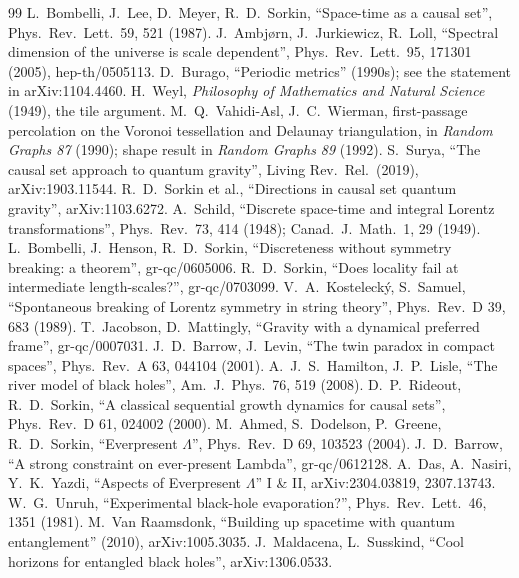 \documentclass[11pt,a4paper]{article}
\begin{document}
\begin{thebibliography}{99}\small
{} L.~Bombelli, J.~Lee, D.~Meyer, R.~D.~Sorkin, ``Space-time as a causal set'', Phys.\ Rev.\ Lett.\ 59, 521 (1987).
 J.~Ambj{\o}rn, J.~Jurkiewicz, R.~Loll, ``Spectral dimension of the universe is scale dependent'', Phys.\ Rev.\ Lett.\ 95, 171301 (2005), hep-th/0505113.
 D.~Burago, ``Periodic metrics'' (1990s); see the statement in arXiv:1104.4460.
 H.~Weyl, \emph{Philosophy of Mathematics and Natural Science} (1949), the tile argument.
 M.~Q.~Vahidi-Asl, J.~C.~Wierman, first-passage percolation on the Voronoi tessellation and Delaunay triangulation, in \emph{Random Graphs 87} (1990); shape result in \emph{Random Graphs 89} (1992).
 S.~Surya, ``The causal set approach to quantum gravity'', Living Rev.\ Rel.\ (2019), arXiv:1903.11544.
 R.~D.~Sorkin et al., ``Directions in causal set quantum gravity'', arXiv:1103.6272.
 A.~Schild, ``Discrete space-time and integral Lorentz transformations'', Phys.\ Rev.\ 73, 414 (1948); Canad.\ J.\ Math.\ 1, 29 (1949).
 L.~Bombelli, J.~Henson, R.~D.~Sorkin, ``Discreteness without symmetry breaking: a theorem'', gr-qc/0605006.
 R.~D.~Sorkin, ``Does locality fail at intermediate length-scales?'', gr-qc/0703099.
 V.~A.~Kosteleck\'y, S.~Samuel, ``Spontaneous breaking of Lorentz symmetry in string theory'', Phys.\ Rev.\ D 39, 683 (1989).
 T.~Jacobson, D.~Mattingly, ``Gravity with a dynamical preferred frame'', gr-qc/0007031.
 J.~D.~Barrow, J.~Levin, ``The twin paradox in compact spaces'', Phys.\ Rev.\ A 63, 044104 (2001).
 A.~J.~S.~Hamilton, J.~P.~Lisle, ``The river model of black holes'', Am.\ J.\ Phys.\ 76, 519 (2008).
 D.~P.~Rideout, R.~D.~Sorkin, ``A classical sequential growth dynamics for causal sets'', Phys.\ Rev.\ D 61, 024002 (2000).
 M.~Ahmed, S.~Dodelson, P.~Greene, R.~D.~Sorkin, ``Everpresent $\Lambda$'', Phys.\ Rev.\ D 69, 103523 (2004).
 J.~D.~Barrow, ``A strong constraint on ever-present Lambda'', gr-qc/0612128.
 A.~Das, A.~Nasiri, Y.~K.~Yazdi, ``Aspects of Everpresent $\Lambda$'' I \& II, arXiv:2304.03819, 2307.13743.
 W.~G.~Unruh, ``Experimental black-hole evaporation?'', Phys.\ Rev.\ Lett.\ 46, 1351 (1981).
 M.~Van Raamsdonk, ``Building up spacetime with quantum entanglement'' (2010), arXiv:1005.3035.
 J.~Maldacena, L.~Susskind, ``Cool horizons for entangled black holes'', arXiv:1306.0533.
\end{thebibliography}
\end{document}
